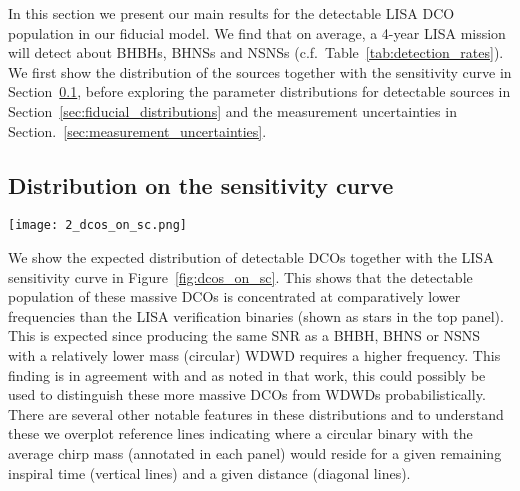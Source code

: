 In this section we present our main results for the detectable LISA DCO population in our fiducial model. We find that on average, a 4-year LISA mission will detect about \BHBHFourYear{} BHBHs, \BHNSFourYear{} BHNSs and \NSNSFourYear{} NSNSs (c.f.\ Table~\ref{tab:detection_rates}). We first show the distribution of the sources together with the sensitivity curve in Section~\ref{sec:dcos_on_sc}, before exploring the parameter distributions for detectable sources in Section~\ref{sec:fiducial_distributions} and the measurement uncertainties in Section.~\ref{sec:measurement_uncertainties}.

\subsection{Distribution on the sensitivity curve}\label{sec:dcos_on_sc}

\begin{figure*}[p]
    \centering
    \texttt{[image: 2\_dcos\_on\_sc.png]}
    \caption{Density distribution of detectable BHBH, BHNS and NSNS binaries are shown together with the LISA sensitivity curve. In the top panel we show all systems with the LISA verification binaries over plotted (star symbols, \citealp{Kupfer+2018}). In the bottom panels we separate by type. Contours show the percentage of the population enclosed. The remaining 2\% of the population is shown as dots with a size that scales with the sampling weight. For reference we show lines where a circular binary of average mass $\avg{\mathcal{M}_c}$ would reside for a given remaining inspiral time (vertical lines) and distance (diagonal line). To highlight the role of eccentricity we further show the signal expected for an eccentric binary at 30 kpc. The coloured line in the bottom panels shows a contour that encloses 90\% of the population that is circular. See Sec.~\ref{sec:dcos_on_sc} for a discussion.}
    \label{fig:dcos_on_sc}
\end{figure*}

We show the expected distribution of detectable DCOs together with the LISA sensitivity curve in Figure~\ref{fig:dcos_on_sc}. This shows that the detectable population of these massive DCOs is concentrated at comparatively lower frequencies than the LISA verification binaries (shown as stars in the top panel). This is expected since producing the same SNR as a BHBH, BHNS or NSNS with a relatively lower mass (circular) WDWD requires a higher frequency. This finding is in agreement with \citet{Sesana+2020} and as noted in that work, this could possibly be used to distinguish these more massive DCOs from WDWDs probabilistically. There are several other notable features in these distributions and to understand these we overplot reference lines indicating where a circular binary with the average chirp mass (annotated in each panel) would reside for a given remaining inspiral time (vertical lines) and a given distance (diagonal lines).


